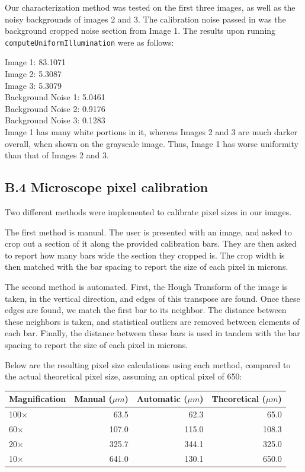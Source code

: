 \documentclass{article}
\begin{document}
Our characterization method was tested on the first three images, as well as the noisy backgrounds of images 2 and 3. The calibration noise passed in was the background cropped noise section from Image 1. The results upon running \texttt{computeUniformIllumination} were as follows:

Image 1: 83.1071\\
Image 2: 5.3087\\
Image 3: 5.3079\\
Background Noise 1: 5.0461\\
Background Noise 2: 0.9176\\
Background Noise 3: 0.1283\\

Image 1 has many white portions in it, whereas Images 2 and 3 are much darker overall, when shown on the grayscale image. Thus, Image 1 has worse uniformity than that of Images 2 and 3.\\

\pagebreak
\subsection*{B.4 Microscope pixel calibration}
 
Two different methods were implemented to calibrate pixel sizes in our images.

The first method is manual. The user is presented with an image, and asked to crop out a section of it along the provided calibration bars. They are then asked to report how many bars wide the section they cropped is. The crop width is then matched with the bar spacing to report the size of each pixel in microns.

The second method is automated. First, the Hough Transform of the image is taken, in the vertical direction, and edges of this transpose are found. Once these edges are found, we match the first bar to its neighbor. The distance between these neighbors is taken, and statistical outliers are removed between elements of each bar. Finally, the distance between these bars is used in tandem with the bar spacing to report the size of each pixel in microns.

Below are the resulting pixel size calculations using each method, compared to the actual theoretical pixel size, assuming an optical pixel of \unit{650}{\nano\meter}:

\begin{center}
\begin{tabular}{l | r | r | r}
     Magnification & Manual ($\mu m$) & Automatic ($\mu m$) & Theoretical ($\mu m$) \\
     \hline\hline
     100$\times$                & 63.5            & 62.3               & 65.0 \\ \hline
     60$\times$                 & 107.0           & 115.0              & 108.3 \\ \hline
     20$\times$                 & 325.7           & 344.1              & 325.0 \\ \hline
     10$\times$                 & 641.0           & 130.1              & 650.0
\end{tabular}
\end{center}
\end{document}
